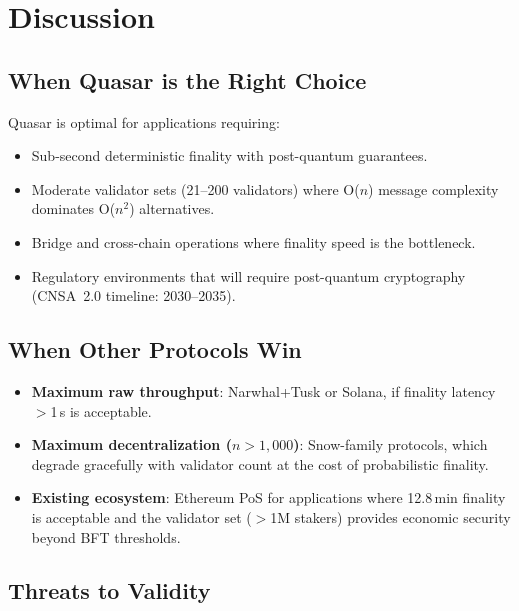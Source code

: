 \section{Discussion}

\label{sec:discussion}

\subsection{When Quasar is the Right Choice}

Quasar is optimal for applications requiring:
\begin{itemize}
\item Sub-second deterministic finality with post-quantum guarantees.
\item Moderate validator sets (21--200 validators) where O($n$) message complexity
      dominates O($n^2$) alternatives.
\item Bridge and cross-chain operations where finality speed is the bottleneck.
\item Regulatory environments that will require post-quantum cryptography (CNSA~2.0
      timeline: 2030--2035).
\end{itemize}

\subsection{When Other Protocols Win}

\begin{itemize}
\item \textbf{Maximum raw throughput}: Narwhal+Tusk or Solana, if finality latency
      $>$1\,s is acceptable.
\item \textbf{Maximum decentralization ($n > 1{,}000$)}: Snow-family protocols, which
      degrade gracefully with validator count at the cost of probabilistic finality.
\item \textbf{Existing ecosystem}: Ethereum PoS for applications where 12.8\,min
      finality is acceptable and the validator set ($>$1M stakers) provides economic
      security beyond BFT thresholds.
\end{itemize}

\subsection{Threats to Validity}

